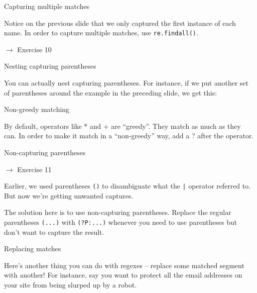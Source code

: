\documentclass{beamer}
\begin{document}
\begin{frame}{Capturing multiple matches}

Notice on the previous slide that we only captured the first instance of each name.
In order to capture multiple matches, use \lstinline$re.findall()$.



$\rightarrow$ Exercise 10

\end{frame}

\begin{frame}{Nesting capturing parentheses}

You can actually nest capturing parentheses. For instance, if we put
another set of parentheses around the example in the preceding slide, 
we get this:

\bigskip



\end{frame}


\begin{frame}{Non-greedy matching}

By default, operators like * and + are ``greedy''. They match as much
as they can. In order to make it match in a ``non-greedy'' way, add a ?
after the operator.



\end{frame}

\begin{frame}{Non-capturing parentheses}

$\rightarrow$ Exercise 11

\bigskip

Earlier, we used parentheses  \lstinline$()$ to disambiguate what the \lstinline$|$ operator
referred to. But now we're getting unwanted captures.

\bigskip

The solution here is to use non-capturing parentheses. Replace the regular 
parentheses  \lstinline$(...)$ with  \lstinline$(?P:...)$ whenever you
need to use parentheses but don't want to capture the result.

\end{frame}

\begin{frame}{Replacing matches}

Here's another thing you can do with regexes -- replace some matched segment
with another! For instance, say you want to protect all the email addresses
on your site from being slurped up by a robot. %

\end{frame}
\end{document}
